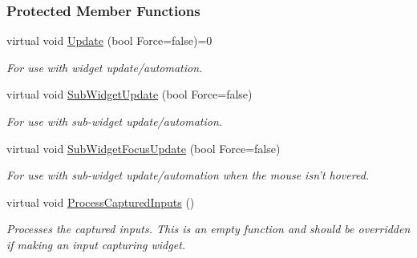 \subsubsection*{Protected Member Functions}
\begin{DoxyCompactItemize}
\item 
\hypertarget{classphys_1_1UI_1_1Widget_a1806425fcd684c2f0d50cd0ef4a6b0da}{
virtual void \hyperlink{classphys_1_1UI_1_1Widget_a1806425fcd684c2f0d50cd0ef4a6b0da}{Update} (bool Force=false)=0}
\label{d9/d48/classphys_1_1UI_1_1Widget_a1806425fcd684c2f0d50cd0ef4a6b0da}

\begin{DoxyCompactList}\small\item\em For use with widget update/automation. \item\end{DoxyCompactList}\item 
\hypertarget{classphys_1_1UI_1_1Widget_a3472e5d0f8281e704d67d419980cd918}{
virtual void \hyperlink{classphys_1_1UI_1_1Widget_a3472e5d0f8281e704d67d419980cd918}{SubWidgetUpdate} (bool Force=false)}
\label{d9/d48/classphys_1_1UI_1_1Widget_a3472e5d0f8281e704d67d419980cd918}

\begin{DoxyCompactList}\small\item\em For use with sub-\/widget update/automation. \item\end{DoxyCompactList}\item 
\hypertarget{classphys_1_1UI_1_1Widget_a4a7e18c48a7cd230fd4a0aa274c6a654}{
virtual void \hyperlink{classphys_1_1UI_1_1Widget_a4a7e18c48a7cd230fd4a0aa274c6a654}{SubWidgetFocusUpdate} (bool Force=false)}
\label{d9/d48/classphys_1_1UI_1_1Widget_a4a7e18c48a7cd230fd4a0aa274c6a654}

\begin{DoxyCompactList}\small\item\em For use with sub-\/widget update/automation when the mouse isn't hovered. \item\end{DoxyCompactList}\item 
\hypertarget{classphys_1_1UI_1_1Widget_ac51b863fb1a9c5ebaef1386b77dbda99}{
virtual void \hyperlink{classphys_1_1UI_1_1Widget_ac51b863fb1a9c5ebaef1386b77dbda99}{ProcessCapturedInputs} ()}
\label{d9/d48/classphys_1_1UI_1_1Widget_ac51b863fb1a9c5ebaef1386b77dbda99}

\begin{DoxyCompactList}\small\item\em Processes the captured inputs. This is an empty function and should be overridden if making an input capturing widget. \item\end{DoxyCompactList}\end{DoxyCompactItemize}
